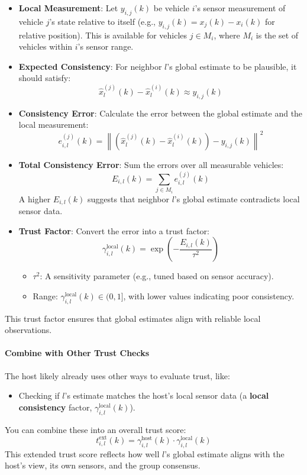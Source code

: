 \documentclass[letterpaper, 10pt, conference]{ieeeconf}  %
\begin{document}
\begin{itemize}
    \item \textbf{Local Measurement}: Let \( y_{i,j}(k) \) be vehicle \( i \)'s sensor measurement of vehicle \( j \)'s state relative to itself (e.g., \( y_{i,j}(k) = x_j(k) - x_i(k) \) for relative position). This is available for vehicles \( j \in M_i \), where \( M_i \) is the set of vehicles within \( i \)'s sensor range.

    \item \textbf{Expected Consistency}: For neighbor \( l \)'s global estimate to be plausible, it should satisfy:
    \[
    \hat{x}_l^{(j)}(k) - \hat{x}_l^{(i)}(k) \approx y_{i,j}(k)
    \]

    \item \textbf{Consistency Error}: Calculate the error between the global estimate and the local measurement:
    \[
    e_{i,l}^{(j)}(k) = \left\| \left( \hat{x}_l^{(j)}(k) - \hat{x}_l^{(i)}(k) \right) - y_{i,j}(k) \right\|^2
    \]

    \item \textbf{Total Consistency Error}: Sum the errors over all measurable vehicles:
    \[
    E_{i,l}(k) = \sum_{j \in M_i} e_{i,l}^{(j)}(k)
    \]
    A higher \( E_{i,l}(k) \) suggests that neighbor \( l \)'s global estimate contradicts local sensor data.

    \item \textbf{Trust Factor}: Convert the error into a trust factor:
    \[
    \gamma_{i,l}^{\text{local}}(k) = \exp\left( -\frac{E_{i,l}(k)}{\tau^2} \right)
    \]
    \begin{itemize}
        \item \( \tau^2 \): A sensitivity parameter (e.g., tuned based on sensor accuracy).
        \item Range: \( \gamma_{i,l}^{\text{local}}(k) \in (0, 1] \), with lower values indicating poor consistency.
    \end{itemize}
\end{itemize}

This trust factor ensures that global estimates align with reliable local observations.

\paragraph{Combine with Other Trust Checks}  
    The host likely already uses other ways to evaluate trust, like:
    \begin{itemize}
        \item Checking if \( l \)'s estimate matches the host's local sensor data (a \textbf{local consistency} factor, \( \gamma_{i,l}^{\text{local}}(k) \)).
    \end{itemize}
    You can combine these into an overall trust score:
    \[
    t_{i,l}^{\text{ext}}(k) = \gamma_{i,l}^{\text{host}}(k) \cdot \gamma_{i,l}^{\text{local}}(k) 
    \]
    This extended trust score reflects how well \( l \)'s global estimate aligns with the host's view, its own sensors, and the group consensus.
\end{document}
